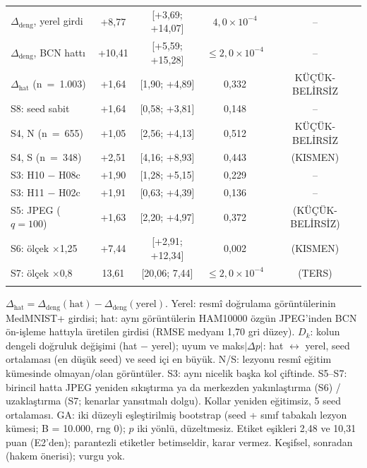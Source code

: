 \begin{table}[!htbp]
\begin{tabular*}{\textwidth}{@{\extracolsep{\fill}}lcccc}
\midrule
$\Delta_{\text{deng}}$, yerel girdi & +8,77 & [+3,69; +14,07] & $4{,}0{\times}10^{-4}$ & -- \\
$\Delta_{\text{deng}}$, BCN hattı & +10,41 & [+5,59; +15,28] & $\leq2{,}0{\times}10^{-4}$ & -- \\
$\Delta_{\text{hat}}$ (n~=~1.003) & +1,64 & [\textminus{}1,90; +4,89] & 0,332 & KÜÇÜK-BELİRSİZ \\
\quad S8: seed sabit & +1,64 & [\textminus{}0,58; +3,81] & 0,148 & -- \\
\quad S4, N (n~=~655) & +1,05 & [\textminus{}2,56; +4,13] & 0,512 & KÜÇÜK-BELİRSİZ \\
\quad S4, S (n~=~348) & +2,51 & [\textminus{}4,16; +8,93] & 0,443 & (KISMEN) \\
S3: H10 $-$ H08c & +1,90 & [\textminus{}1,28; +5,15] & 0,229 & -- \\
S3: H11 $-$ H02c & +1,91 & [\textminus{}0,63; +4,39] & 0,136 & -- \\
S5: JPEG ($q=100$) & +1,63 & [\textminus{}2,20; +4,97] & 0,372 & (KÜÇÜK-BELİRSİZ) \\
S6: ölçek $\times$1,25 & +7,44 & [+2,91; +12,34] & 0,002 & (KISMEN) \\
S7: ölçek $\times$0,8 & \textminus{}13,61 & [\textminus{}20,06; \textminus{}7,44] & $\leq2{,}0{\times}10^{-4}$ & (TERS) \\
\botrule
\end{tabular*}
\par\smallskip\raggedright $\Delta_{\text{hat}}=\Delta_{\text{deng}}(\text{hat})-\Delta_{\text{deng}}(\text{yerel})$. Yerel: resmî doğrulama görüntülerinin MedMNIST+ girdisi; hat: aynı görüntülerin HAM10000 özgün JPEG'inden BCN ön-işleme hattıyla üretilen girdisi (RMSE medyanı 1,70 gri düzey). $D_k$: kolun dengeli doğruluk değişimi (hat $-$ yerel); uyum ve maks$|\Delta p|$: hat $\leftrightarrow$ yerel, seed ortalaması (en düşük seed) ve seed içi en büyük. N/S: lezyonu resmî eğitim kümesinde olmayan/olan görüntüler. S3: aynı nicelik başka kol çiftinde. S5--S7: birincil hatta JPEG yeniden sıkıştırma ya da merkezden yakınlaştırma (S6) / uzaklaştırma (S7; kenarlar yansıtmalı dolgu). Kollar yeniden eğitimsiz, 5 seed ortalaması. GA: iki düzeyli eşleştirilmiş bootstrap (seed + sınıf tabakalı lezyon kümesi; B = 10.000, rng 0); $p$ iki yönlü, düzeltmesiz. Etiket eşikleri 2,48 ve 10,31 puan (E2'den); parantezli etiketler betimseldir, karar vermez. Keşifsel, sonradan (hakem önerisi); vurgu yok.
\end{table}
